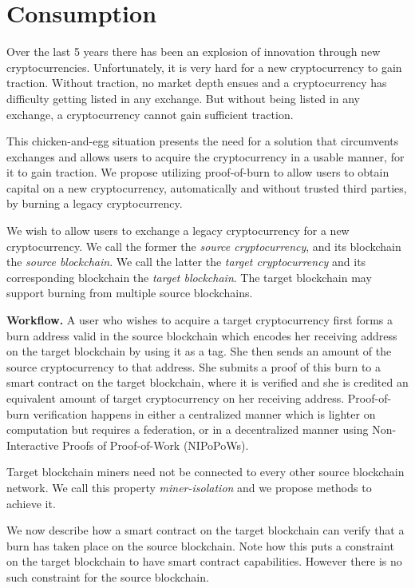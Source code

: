 \section{Consumption}

Over the last 5 years there has been an explosion of innovation through new cryptocurrencies. Unfortunately, it is very hard for a new cryptocurrency to gain traction. Without traction, no market depth ensues and a cryptocurrency has difficulty getting listed in any exchange. But without being listed in any exchange, a cryptocurrency cannot gain sufficient traction.

This chicken-and-egg situation presents the need for a solution that circumvents exchanges and allows users to acquire the cryptocurrency in a usable manner, for it to gain traction. We propose utilizing proof-of-burn to allow users to obtain capital on a new cryptocurrency, automatically and without trusted third parties, by burning a legacy cryptocurrency.

We wish to allow users to exchange a legacy cryptocurrency for a new cryptocurrency. We call the former the \emph{source cryptocurrency}, and its blockchain the \emph{source blockchain}. We call the latter the \emph{target cryptocurrency} and its corresponding blockchain the \emph{target blockchain}. The target blockchain may support burning from multiple source blockchains.

\noindent
\textbf{Workflow.}
A user who wishes to acquire a target cryptocurrency first forms a burn address valid in the source blockchain which encodes her receiving address on the target blockchain by using it as a tag. She then sends an amount of the source cryptocurrency to that address. She submits a proof of this burn to a smart contract on the target blockchain, where it is verified and she is credited an equivalent amount of target cryptocurrency on her receiving address. Proof-of-burn verification happens in either a centralized manner which is lighter on computation but requires a federation, or in a decentralized manner using Non-Interactive Proofs of Proof-of-Work (NIPoPoWs).

Target blockchain miners need not be connected to every other source blockchain network. We call this property \emph{miner-isolation} and we propose methods to achieve it.

We now describe how a smart contract on the target blockchain can verify that a burn has taken place on the source blockchain. Note how this puts a constraint on the target blockchain to have smart contract capabilities. However there is no such constraint for the source blockchain.

